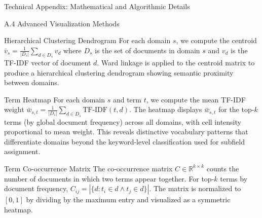 \documentclass[
  ignorenonframetext,
]{beamer}
\begin{document}
\begin{frame}{Technical Appendix: Mathematical and Algorithmic Details
\label{sec:technical_appendix}}
\begin{block}{A.4 Advanced Visualization Methods}
\begin{block}{Hierarchical Clustering Dendrogram}
\protect{}\label{hierarchical-clustering-dendrogram}
For each domain \(s\), we compute the centroid
\(\bar{v}_s = \frac{1}{|D_s|} \sum_{d \in D_s} v_d\) where \(D_s\) is
the set of documents in domain \(s\) and \(v_d\) is the TF-IDF vector of
document \(d\). Ward linkage is applied to the centroid matrix to
produce a hierarchical clustering dendrogram showing semantic proximity
between domains.
\end{block}

\begin{block}{Term Heatmap}
\protect{}\label{term-heatmap}
For each domain \(s\) and term \(t\), we compute the mean TF-IDF weight
\(\bar{w}_{s,t} = \frac{1}{|D_s|} \sum_{d \in D_s} \text{TF-IDF}(t, d)\).
The heatmap displays \(\bar{w}_{s,t}\) for the top-\(k\) terms (by
global document frequency) across all domains, with cell intensity
proportional to mean weight. This reveals distinctive vocabulary
patterns that differentiate domains beyond the keyword-level
classification used for subfield assignment.
\end{block}

\begin{block}{Term Co-occurrence Matrix}
\protect{}\label{term-co-occurrence-matrix}
The co-occurrence matrix \(C \in \mathbb{R}^{k \times k}\) counts the
number of documents in which two terms appear together. For top-\(k\)
terms by document frequency,
\(C_{ij} = |\{d : t_i \in d \land t_j \in d\}|\). The matrix is
normalized to \([0, 1]\) by dividing by the maximum entry and visualized
as a symmetric heatmap.
\end{block}
\end{block}
\end{frame}
\end{document}
